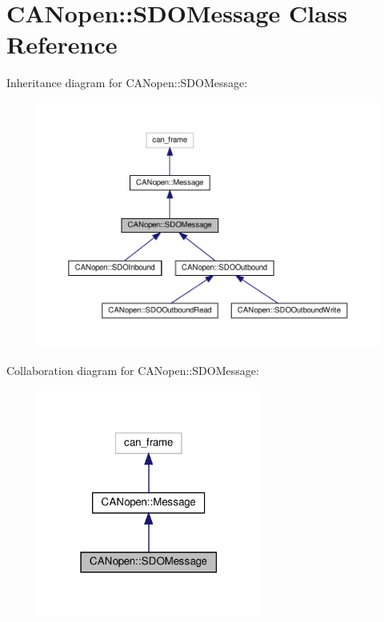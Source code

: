 \hypertarget{class_c_a_nopen_1_1_s_d_o_message}{}\section{C\+A\+Nopen\+:\+:S\+D\+O\+Message Class Reference}
\label{class_c_a_nopen_1_1_s_d_o_message}


Inheritance diagram for C\+A\+Nopen\+:\+:S\+D\+O\+Message\+:\nopagebreak
\begin{figure}[H]
\begin{center}
\leavevmode
\includegraphics[width=350pt]{class_c_a_nopen_1_1_s_d_o_message__inherit__graph}
\end{center}
\end{figure}


Collaboration diagram for C\+A\+Nopen\+:\+:S\+D\+O\+Message\+:\nopagebreak
\begin{figure}[H]
\begin{center}
\leavevmode
\includegraphics[width=207pt]{class_c_a_nopen_1_1_s_d_o_message__coll__graph}
\end{center}
\end{figure}
